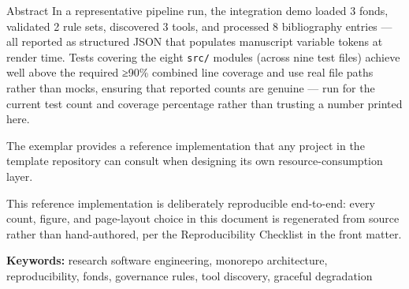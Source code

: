\documentclass[
  ignorenonframetext,
]{beamer}
\begin{document}
\begin{frame}{Abstract}
In a representative pipeline run, the integration demo loaded 3 fonds,
validated 2 rule sets, discovered 3 tools, and processed 8 bibliography
entries --- all reported as structured JSON that populates manuscript
variable tokens at render time. Tests covering the eight \texttt{src/}
modules (across nine test files) achieve well above the required ≥90\%
combined line coverage and use real file paths rather than mocks,
ensuring that reported counts are genuine --- run
 for the current test
count and coverage percentage rather than trusting a number printed
here.

The  exemplar provides a reference
implementation that any project in the template repository can consult
when designing its own resource-consumption layer.

This reference implementation is deliberately reproducible end-to-end:
every count, figure, and page-layout choice in this document is
regenerated from source rather than hand-authored, per the
Reproducibility Checklist in the front matter.

\textbf{Keywords:} research software engineering, monorepo architecture,
reproducibility, fonds, governance rules, tool discovery, graceful
degradation
\end{frame}
\end{document}
